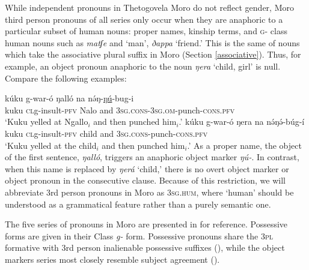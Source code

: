 While independent pronouns in Thetogovela Moro do not reflect gender, Moro third person pronouns of all series only occur when they are anaphoric to a particular subset of human nouns: proper names, kinship terms, and \textsc{g-} class human nouns such as \textit{matʃe} and  `man', \textit{ðappa} `friend.' This is the same of nouns which take the associative plural suffix in Moro (Section \ref{associative}). Thus, for example, an object pronoun anaphoric to the noun \textit{ŋera} `child, girl' is null. Compare the following examples:

\ea	
	\ea  \gll kúku g-war-ó ŋalló na nə́ŋ-\underline{ŋú}-bug-i\\
		kuku \textsc{cl}g-insult-\textsc{pfv} Nalo and \textsc{3sg.cons}-\textsc{3sg.om}-punch-\textsc{cons.pfv}\\
		\glt `Kuku yelled at Ngallo$_i$ and then punched him$_i$.'
	\ex \gll kúku g-war-ó ŋera na nə́ŋə́-búg-í\\
			kuku \textsc{cl}g-insult-\textsc{pfv} child and \textsc{3sg.cons}-punch-\textsc{cons.pfv}\\
		\glt `Kuku yelled at the child$_i$ and then punched him$_i$.'
	\z
\z 
As a proper name, the object of the first sentence, \textit{ŋalló}, triggers an anaphoric object marker \textit{ŋú-}. In contrast, when this name is replaced by \textit{ŋerá} `child,' there is no overt object marker or object pronoun in the consecutive clause. Because of this restriction, we will abbreviate 3rd person pronouns in Moro as \textsc{3sg.hum}, where `human' should be understood as a grammatical feature rather than a purely semantic one. %

The five series of pronouns in Moro are presented in  for reference. Possessive forms are given in their Class \textit{g-} form. Possessive pronouns share the 3\textsc{pl} formative with 3rd person inalienable possessive suffixes (), while the object markers series most closely resemble subject agreement ().

